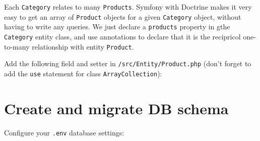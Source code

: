 \documentclass[a4paperpaper,openright]{book}
\newenvironment{Shaded}{}{}
\newcommand{\AnnotationTok}[1]{\textcolor[rgb]{0.38,0.63,0.69}{\textbf{\textit{#1}}}}
\newcommand{\CommentTok}[1]{\textcolor[rgb]{0.38,0.63,0.69}{\textit{#1}}}
\newcommand{\FunctionTok}[1]{\textcolor[rgb]{0.02,0.16,0.49}{#1}}
\newcommand{\KeywordTok}[1]{\textcolor[rgb]{0.00,0.44,0.13}{\textbf{#1}}}
\newcommand{\NormalTok}[1]{#1}
\newcommand{\OtherTok}[1]{\textcolor[rgb]{0.00,0.44,0.13}{#1}}
\newcommand{\StringTok}[1]{\textcolor[rgb]{0.25,0.44,0.63}{#1}}
\begin{document}
Each \texttt{Category} relates to many \texttt{Products}. Symfony with
Doctrine makes it very easy to get an array of \texttt{Product} objects
for a given \texttt{Category} object, without having to write any
queries. We just declare a \texttt{products} property in gthe
\texttt{Category} entity class, and use annotations to declare that it
is the recipricol one-to-many relationship with entity \texttt{Product}.

Add the following field and setter in \texttt{/src/Entity/Product.php}
(don't forget to add the \texttt{use} statement for class
\texttt{ArrayCollection}):

\begin{Shaded}
\end{Shaded}

\hypertarget{create-and-migrate-db-schema}{%
\section{Create and migrate DB
schema}\label{create-and-migrate-db-schema}}

Configure your \texttt{.env} database settings:
\end{document}

